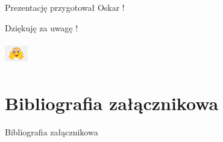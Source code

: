 \documentclass{beamer}
\begin{document}
\begin{frame}
	\begin{Center}
		\begin{spacing}{1} Prezentację przygotował Oskar !\end{spacing}
		\begin{spacing}{2} Dziękuję za uwagę !\end{spacing}
		\begin{spacing}{2} \includegraphics[width=1cm,height=1cm]{usmiechnieta_buzka.png} \end{spacing}
	\end{Center}
\end{frame}

\section{Bibliografia załącznikowa}
\begin{frame}{Bibliografia załącznikowa}
\end{frame}
\end{document}
